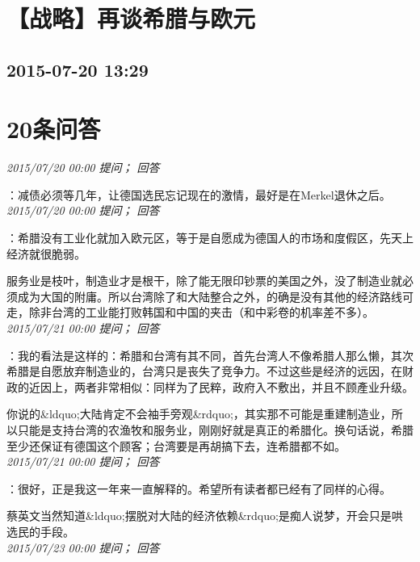 \documentclass[twocolumn]{ctexart}
\begin{document}
\section{【战略】再谈希腊与欧元}
\subsection{2015-07-20 13:29}


\section{20条问答}

\textit{\hfill\noindent\small 2015/07/20 00:00 提问； 回答}

：减债必须等几年，让德国选民忘记现在的激情，最好是在Merkel退休之后。\\

\textit{\hfill\noindent\small 2015/07/20 00:00 提问； 回答}

：希腊没有工业化就加入欧元区，等于是自愿成为德国人的市场和度假区，先天上经济就很脆弱。

服务业是枝叶，制造业才是根干，除了能无限印钞票的美国之外，没了制造业就必须成为大国的附庸。所以台湾除了和大陆整合之外，的确是没有其他的经济路线可走，除非台湾的工业能打败韩国和中国的夹击（和中彩卷的机率差不多）。\\

\textit{\hfill\noindent\small 2015/07/21 00:00 提问； 回答}

：我的看法是这样的：希腊和台湾有其不同，首先台湾人不像希腊人那么懒，其次希腊是自愿放弃制造业的，台湾只是丧失了竞争力。不过这些是经济的远因，在财政的近因上，两者非常相似：同样为了民粹，政府入不敷出，并且不顾產业升级。

你说的\&ldquo;大陆肯定不会袖手旁观\&rdquo;，其实那不可能是重建制造业，所以只能是支持台湾的农渔牧和服务业，刚刚好就是真正的希腊化。换句话说，希腊至少还保证有德国这个顾客；台湾要是再胡搞下去，连希腊都不如。\\

\textit{\hfill\noindent\small 2015/07/21 00:00 提问； 回答}

：很好，正是我这一年来一直解释的。希望所有读者都已经有了同样的心得。

蔡英文当然知道\&ldquo;摆脱对大陆的经济依赖\&rdquo;是痴人说梦，开会只是哄选民的手段。\\

\textit{\hfill\noindent\small 2015/07/23 00:00 提问； 回答}
\end{document}
